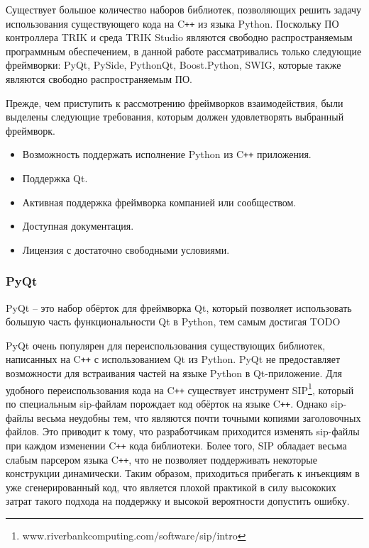 \documentclass[14pt]{matmex-diploma-custom}
\begin{document}
Существует большое количество наборов библиотек, позволяющих решить задачу использования существующего кода на C\texttt{++} из языка Python. Поскольку ПО контроллера TRIK и среда TRIK Studio являются свободно распространяемым программным обеспечением, в данной работе рассматривались только следующие фреймворки: PyQt, PySide, PythonQt, Boost.Python, SWIG, которые также являются свободно распространяемым ПО.

Прежде, чем приступить к рассмотрению фреймворков взаимодействия, были выделены следующие требования, которым должен удовлетворять выбранный фреймворк.

\begin{itemize}
    \item Возможность поддержать исполнение Python из C\texttt{++} приложения.
    \item Поддержка Qt.
    \item Активная поддержка фреймворка компанией или сообществом.
    \item Доступная документация.
    \item Лицензия с достаточно свободными условиями.
\end{itemize}

\subsubsection{PyQt}

PyQt \cite{pyqt} -- это набор обёрток для фреймворка Qt, который позволяет использовать большую часть функциональности Qt в Python, тем самым достигая TODO

PyQt очень популярен для переиспользования существующих библиотек, написанных на C\texttt{++} с использованием Qt из Python. PyQt не предоставляет возможности для встраивания частей на языке Python в Qt-приложение. Для удобного переиспользования кода на C\texttt{++} существует инструмент SIP\footnote{www.riverbankcomputing.com/software/sip/intro}, который по специальным sip-файлам порождает код обёрток на языке C\texttt{++}. Однако sip-файлы весьма неудобны тем, что являются почти точными копиями заголовочных файлов. Это приводит к тому, что разработчикам приходится изменять sip-файлы при каждом изменении C\texttt{++} кода библиотеки. Более того, SIP обладает весьма слабым парсером языка C\texttt{++}, что не позволяет поддерживать некоторые конструкции динамически. Таким образом, приходиться прибегать к инъекциям в уже сгенерированный код, что является плохой практикой в силу высококих затрат такого подхода на поддержку и высокой вероятности допустить ошибку.
\end{document}
